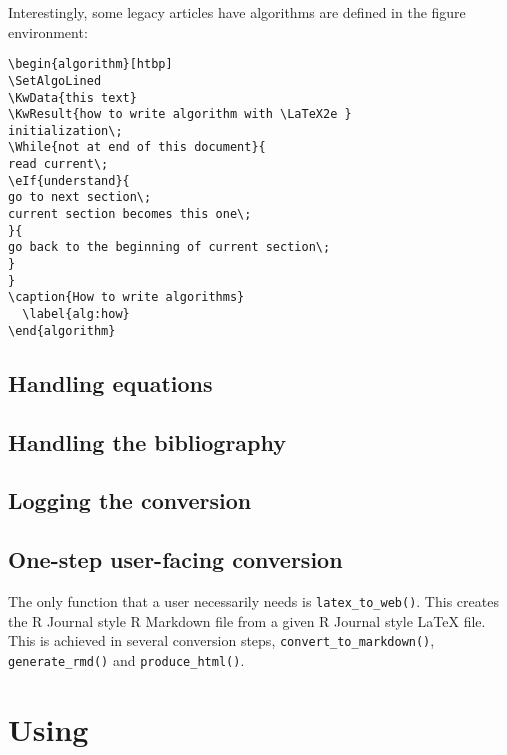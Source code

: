 Interestingly, some legacy articles have algorithms are defined in the figure environment:

\begin{verbatim}
\begin{algorithm}[htbp]
\SetAlgoLined
\KwData{this text}
\KwResult{how to write algorithm with \LaTeX2e }
initialization\;
\While{not at end of this document}{
read current\;
\eIf{understand}{
go to next section\;
current section becomes this one\;
}{
go back to the beginning of current section\;
}
}
\caption{How to write algorithms}
  \label{alg:how}
\end{algorithm}
\end{verbatim}

\hypertarget{handling-equations}{%
\subsection{Handling equations}\label{handling-equations}}

\hypertarget{handling-the-bibliography}{%
\subsection{Handling the bibliography}\label{handling-the-bibliography}}

\hypertarget{logging-the-conversion}{%
\subsection{Logging the conversion}\label{logging-the-conversion}}

\hypertarget{one-step-user-facing-conversion}{%
\subsection{One-step user-facing conversion}\label{one-step-user-facing-conversion}}

The only function that a user necessarily needs is \texttt{latex\_to\_web()}. This creates the R Journal style R Markdown file from a given R Journal style LaTeX file.
This is achieved in several conversion steps, \texttt{convert\_to\_markdown()}, \texttt{generate\_rmd()} and \texttt{produce\_html()}.

\hypertarget{using}{%
\section{\texorpdfstring{Using }{Using }}\label{using}}

